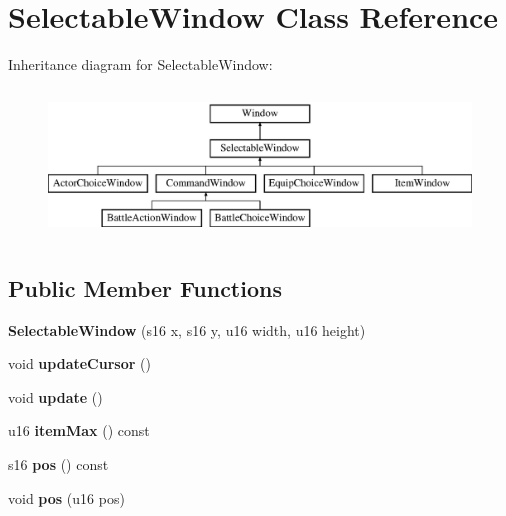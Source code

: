 \hypertarget{classSelectableWindow}{\section{Selectable\-Window Class Reference}
\label{classSelectableWindow}
}
Inheritance diagram for Selectable\-Window\-:\begin{figure}[H]
\begin{center}
\leavevmode
\includegraphics[height=4.000000cm]{classSelectableWindow}
\end{center}
\end{figure}
\subsection*{Public Member Functions}
\begin{DoxyCompactItemize}
\item 
\hypertarget{classSelectableWindow_abdf0b9056eb66248ecf1020a0a668b5f}{{\bfseries Selectable\-Window} (s16 x, s16 y, u16 width, u16 height)}\label{classSelectableWindow_abdf0b9056eb66248ecf1020a0a668b5f}

\item 
\hypertarget{classSelectableWindow_ae9fad1c1c7208df039e8b9fa5e7374b2}{void {\bfseries update\-Cursor} ()}\label{classSelectableWindow_ae9fad1c1c7208df039e8b9fa5e7374b2}

\item 
\hypertarget{classSelectableWindow_aa881020eda312ed8f11b1fd11cfe8a26}{void {\bfseries update} ()}\label{classSelectableWindow_aa881020eda312ed8f11b1fd11cfe8a26}

\item 
\hypertarget{classSelectableWindow_a039c71387c608d0704d65001e6a6836e}{u16 {\bfseries item\-Max} () const }\label{classSelectableWindow_a039c71387c608d0704d65001e6a6836e}

\item 
\hypertarget{classSelectableWindow_a75ffe4a1e88d35abddc3b68a831dbe91}{s16 {\bfseries pos} () const }\label{classSelectableWindow_a75ffe4a1e88d35abddc3b68a831dbe91}

\item 
\hypertarget{classSelectableWindow_ab3645b68efa7d6b18863e0bdada9c78f}{void {\bfseries pos} (u16 pos)}\label{classSelectableWindow_ab3645b68efa7d6b18863e0bdada9c78f}

\end{DoxyCompactItemize}
